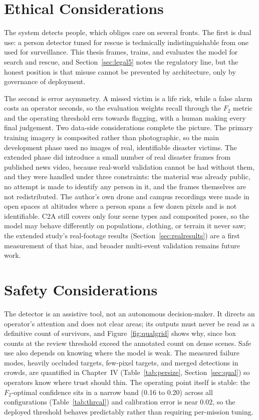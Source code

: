 \section{Ethical Considerations}
The system detects people, which obliges care on several fronts. The first is
dual use: a person detector tuned for rescue is technically indistinguishable
from one used for surveillance. This thesis frames, trains, and evaluates the
model for search and rescue, and Section~\ref{sec:legal5} notes the
regulatory line, but the honest position is that misuse cannot be prevented
by architecture, only by governance of deployment.

The second is error asymmetry. A missed victim is a life risk, while a false
alarm costs an operator seconds, so the evaluation weights recall through the
$F_2$ metric and the operating threshold errs towards flagging, with a human
making every final judgement. Two data-side considerations complete the
picture. The primary training imagery is composited rather than photographic,
so the main development phase used no images of real, identifiable disaster
victims. The extended phase did introduce a small number of real disaster
frames from published news video, because real-world validation cannot be had
without them, and they were handled under three constraints: the material was
already public, no attempt is made to identify any person in it, and the
frames themselves are not redistributed. The author's own drone and campus
recordings were made in open spaces at altitudes where a person spans a few
dozen pixels and is not identifiable. C2A still covers only four scene types
and composited poses, so the model may behave differently on populations,
clothing, or terrain it never saw; the extended study's real-footage results
(Section~\ref{sec:realresults}) are a first measurement of that bias, and
broader multi-event validation remains future work.

\section{Safety Considerations}
The detector is an assistive tool, not an autonomous decision-maker. It
directs an operator's attention and does not clear areas; its outputs must
never be read as a definitive count of survivors, and
Figure~\ref{fig:qualgrid} shows why, since box counts at the review threshold
exceed the annotated count on dense scenes. Safe use also depends on knowing
where the model is weak. The measured failure modes, heavily occluded
targets, few-pixel targets, and merged detections in crowds, are quantified
in Chapter~IV (Table~\ref{tab:persize}, Section~\ref{sec:qual}) so operators
know where trust should thin. The operating point itself is stable: the
$F_2$-optimal confidence sits in a narrow band (0.16 to 0.20) across all
configurations (Table~\ref{tab:thrcal}) and calibration error is near
$0.02$, so the deployed threshold behaves predictably rather than requiring
per-mission tuning.

